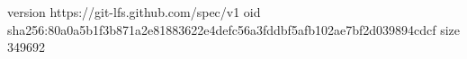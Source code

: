 version https://git-lfs.github.com/spec/v1
oid sha256:80a0a5b1f3b871a2e81883622e4defc56a3fddbf5afb102ae7bf2d039894cdcf
size 349692

